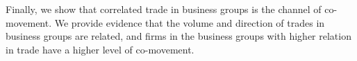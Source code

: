 \begin{LTR}
	Finally, we show that correlated trade in business groups is the channel of co-movement. We provide evidence that the volume and direction of trades in business groups are related, and firms in the business groups with higher relation in trade have a higher level of co-movement.
	
	
	
\end{LTR}

